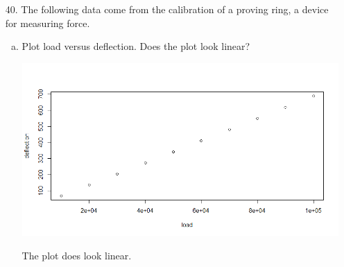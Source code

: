 \documentclass{article}
\begin{document}
\begin{itemize}
\begin{enumerate}[a.]
		\end{enumerate}
		
		\newpage
	\item[40.] The following data come from the calibration of a proving ring, a device for measuring force.
		\begin{enumerate}[a.]
			\item Plot load versus deflection. Does the plot look linear?
				\begin{center}
					\includegraphics[width=14cm]{run_deflection.png}
				\end{center}
				\begin{answer*}
					The plot does look linear.
				\end{answer*}


\end{enumerate}
\end{itemize}
\end{document}
